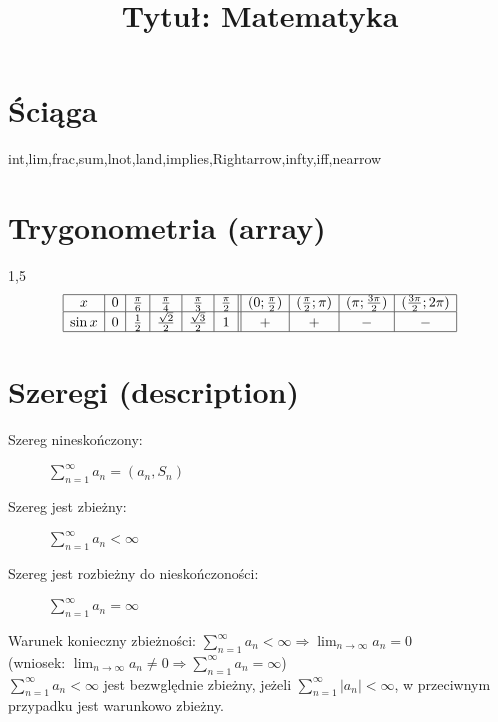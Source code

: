 \documentclass[12pt]{article}
\title{Tytuł: Matematyka}
\date{}
\begin{document}
\maketitle

\section*{Ściąga}

int,lim,frac,sum,lnot,land,implies,Rightarrow,infty,iff,nearrow

\section{Trygonometria (array)}

\begin{spacing}{1,5}
\[
	\begin{array}{|c|c|c|c|c|c||c|c|c|c|}
		\hline
		x & 0 & \frac{\pi}{6} & \frac{\pi}{4} & \frac{\pi}{3} & \frac{\pi}{2} &
		(0; \frac{\pi}{2}) & (\frac{\pi}{2};\pi) & (\pi;\frac{3\pi}{2}) & (\frac{3\pi}{2}; 2\pi)\\
		\hline
		\sin x & 0 & \frac{1}{2} & \frac{\sqrt{2}}{2} & \frac{\sqrt{3}}{2} & 1 & + & + & - & -\\
		\hline
	\end{array}
\]
\end{spacing}

\section{Szeregi (description)}

\begin{description}
	\item[Szereg nineskończony:] $\displaystyle \sum_{n=1}^\infty a_n = (a_n, S_n)$
	\item[Szereg jest zbieżny:] $\displaystyle \sum_{n=1}^\infty a_n < \infty$
	\item[Szereg jest rozbieżny do nieskończoności:] $\displaystyle \sum_{n=1}^\infty a_n = \infty$
\end{description}

\noindent Warunek konieczny zbieżności: $\sum_{n=1}^\infty a_n < \infty \Rightarrow \lim_{n \to \infty} a_n = 0$ \\
(wniosek: $\lim_{n \to \infty} a_n \neq 0 \Rightarrow \displaystyle \sum_{n=1}^\infty a_n = \infty$) \\
$\displaystyle \sum_{n=1}^\infty a_n < \infty$ jest bezwględnie zbieżny, 
jeżeli $\displaystyle \sum_{n=1}^\infty |a_n| < \infty$, 
w przeciwnym przypadku jest warunkowo zbieżny.
\end{document}
